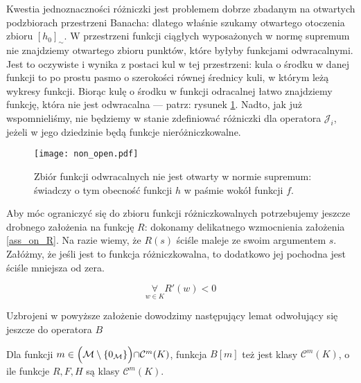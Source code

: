 Kwestia jednoznaczności różniczki jest problemem dobrze zbadanym na otwartych podzbiorach przestrzeni Banacha: dlatego właśnie szukamy otwartego otoczenia zbioru $[h_0]_{\sim}$. W przestrzeni funkcji ciągłych wyposażonych w normę supremum nie znajdziemy otwartego zbioru punktów, które byłyby funkcjami odwracalnymi. Jest to oczywiste i wynika z postaci kul w tej przestrzeni: kula o środku w danej funkcji to po prostu pasmo o szerokości równej średnicy kuli, w którym leżą wykresy funkcji. Biorąc kulę o środku w funkcji odracalnej łatwo znajdziemy funkcję, która nie jest odwracalna --- patrz: rysunek \ref{non_open}. Nadto, jak już wspomnieliśmy, nie będziemy w stanie zdefiniować różniczki dla operatora $\mathcal{J}_i$, jeżeli w jego dziedzinie będą funkcje nieróżniczkowalne. 

\begin{figure}
	\begin{center}
		\texttt{[image: non\_open.pdf]} 
		\caption[Zbiór funkcji odwracalnych nie jest otwarty w normie supremum]{Zbiór funkcji odwracalnych nie jest otwarty w normie supremum: świadczy o tym obecność funkcji $h$ w paśmie wokół funkcji $f$. \\ }\label{non_open}
	\end{center}
\end{figure}

	Aby móc ograniczyć się do zbioru funkcji różniczkowalnych potrzebujemy jeszcze drobnego założenia na funkcję $R$: dokonamy delikatnego wzmocnienia założenia \ref{ass_on_R}. Na razie wiemy, że $R(s)$ ściśle maleje ze swoim argumentem $s$. Załóżmy, że jeśli jest to funkcja różniczkowalna, to dodatkowo jej pochodna jest ściśle mniejsza od zera. 

\begin{ass}
\begin{equation}\label{diff_of_R}
	\underset{w \in K}{\forall}R'(w) < 0
\end{equation}
\end{ass} 
 
Uzbrojeni w powyższe założenie dowodzimy następujący lemat odwołujący się jeszcze do operatora $B$ 
 
\begin{lemat}\label{diff_of_elements_of_M_with_C}
	Dla funkcji $m \in \Bigl(\mathcal{M}\setminus\{ 0_{\mathcal{M}}\}\Bigl)\cap \mathcal{C}^{m}(K)$, funkcja $B[m]$ też jest klasy $\mathcal{C}^{m}(K)$, o ile funkcje $R, F, H$ są klasy $\mathcal{C}^{m}(K)$.
\end{lemat} 

